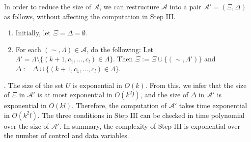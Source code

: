 In order to reduce the size of $\mathscr{A}$, we can restructure $\mathscr{A}$ into a pair $\mathscr{A}'=(\Xi, \Delta)$ as follows, without affecting the computation in Step III.
\begin{enumerate}
\item Initially, let $\Xi = \Delta = \emptyset$.
\item For each $(\sim, \Lambda) \in \mathscr{A}$, do the following: Let $\Lambda' = \Lambda \setminus \{(k+1, c_1, \dots, c_l) \in \Lambda\}$. Then $\Xi := \Xi \cup \{(\sim, \Lambda')\}$ and $\Delta:= \Delta \cup \{(k+1,c_1,\dots, c_l) \in \Lambda\}$.
\end{enumerate}

. The size of the set $U$ is exponential in $O(k)$. From this, we infer that the size of $\Xi$ in $\mathscr{A}'$ is at most exponential in $O(k^2l)$, and the size of $\Delta$ in $\mathscr{A}'$ is exponential in $O(kl)$. Therefore, the computation of $\mathscr{A}'$ takes time exponential in $O(k^2l)$. The three conditions in Step III can be checked in time polynomial over the size of $\mathscr{A}'$. In summary, the complexity of Step III is exponential over the number of control and data variables.


